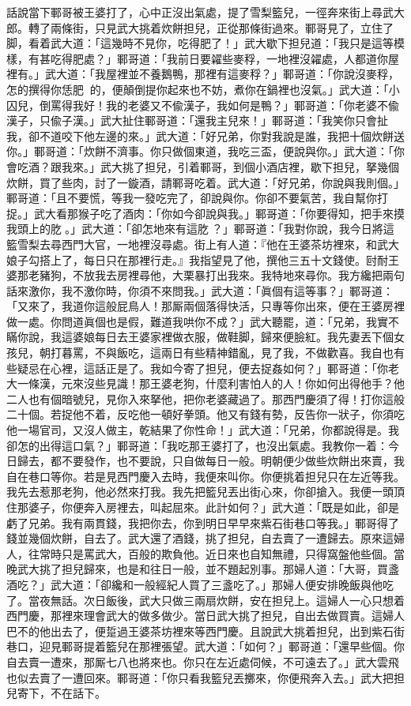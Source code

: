 話說當下鄆哥被王婆打了，心中正沒出氣處，提了雪梨籃兒，一徑奔來街上尋武大郎。轉了兩條街，只見武大挑着炊餅担兒，正從那條街過來。鄆哥見了，立住了脚，看着武大道：「這幾時不見你，吃得肥了！」武大歇下担兒道：「我只是這等模樣，有甚吃得肥處？」鄆哥道：「我前日要糴些麥稃，一地裡沒糴處，人都道你屋裡有。」武大道：「我屋裡並不養鵝鴨，那裡有這麥稃？」鄆哥道：「你說沒麥稃，怎的撰得你恁肥𦞂𦞂的，便顛倒提你起來也不妨，煮你在鍋裡也沒氣。」{}武大道：「小囚兒，倒罵得我好！我的老婆又不偸漢子，{}我如何是鴨？」鄆哥道：「你老婆不偸漢子，只偸子漢。」武大扯住鄆哥道：「還我主兒來！」鄆哥道：「我笑你只會扯我，卻不道咬下他左邊的來。」武大道：「好兄弟，你對我說是誰，我把十個炊餅送你。」鄆哥道：「炊餅不濟事。你只做個東道，我吃三盃，便說與你。」武大道：「你會吃酒？跟我來。」武大挑了担兒，引着鄆哥，到個小酒店裡，歇下担兒，拏幾個炊餅，買了些肉，討了一鏇酒，請鄆哥吃着。武大道：「好兄弟，你說與我則個。」鄆哥道：「且不要慌，等我一發吃完了，卻說與你。你卻不要氣苦，我自幫你打捉。」武大看那猴子吃了酒肉：「你如今卻說與我。」鄆哥道：「你要得知，把手來摸我頭上的肐𦞂。」武大道：「卻怎地來有這肐𦞂？」鄆哥道：「我對你說，我今日將這籃雪梨去尋西門大官，一地裡沒尋處。街上有人道：『他在王婆茶坊裡來，和武大娘子勾搭上了，每日只在那裡行走。』我指望見了他，撰他三五十文錢使。尀耐王婆那老豬狗，不放我去房裡尋他，大栗暴打出我來。我特地來尋你。我方纔把兩句話來激你，我不激你時，你須不來問我。」武大道：「眞個有這等事？」鄆哥道：「又來了，我道你這般屁鳥人！那厮兩個落得快活，只專等你出來，便在王婆房裡做一處。你問道眞個也是假，難道我哄你不成？」武大聽罷，道：「兄弟，我實不瞞你說，我這婆娘每日去王婆家裡做衣服，做鞋脚，歸來便臉紅。我先妻丟下個女孩兒，朝打暮罵，不與飯吃，這兩日有些精神錯亂，見了我，不做歡喜。我自也有些疑忌在心裡，這話正是了。我如今寄了担兒，便去捉姦如何？」鄆哥道：「你老大一條漢，元來沒些見識！那王婆老狗，什麼利害怕人的人！你如何出得他手？他二人也有個暗號兒，見你入來拏他，把你老婆藏過了。那西門慶須了得！打你這般二十個。若捉他不着，反吃他一頓好拳頭。他又有錢有勢，反告你一狀子，你須吃他一場官司，又沒人做主，乾結果了你性命！」{}武大道：「兄弟，你都說得是。我卻怎的出得這口氣？」鄆哥道：「我吃那王婆打了，也沒出氣處。我教你一着：今日歸去，都不要發作，也不要說，只自做每日一般。明朝便少做些炊餅出來賣，我自在巷口等你。若是見西門慶入去時，我便來叫你。你便挑着担兒只在左近等我。我先去惹那老狗，他必然來打我。我先把籃兒丟出街心來，你卻搶入。我便一頭頂住那婆子，你便奔入房裡去，叫起屈來。此計如何？」武大道：「既是如此，卻是虧了兄弟。我有兩貫錢，我把你去，你到明日早早來紫石街巷口等我。」鄆哥得了錢並幾個炊餅，自去了。武大還了酒錢，挑了担兒，自去賣了一遭歸去。原來這婦人，往常時只是罵武大，百般的欺負他。近日來也自知無禮，只得窩盤他些個。{}當晚武大挑了担兒歸來，也是和往日一般，並不題起別事。那婦人道：「大哥，買盞酒吃？」武大道：「卻纔和一般經紀人買了三盞吃了。」那婦人便安排晚飯與他吃了。當夜無話。次日飯後，武大只做三兩扇炊餅，安在担兒上。這婦人一心只想着西門慶，那裡來理會武大的做多做少。當日武大挑了担兒，自出去做買賣。這婦人巴不的他出去了，便踅過王婆茶坊裡來等西門慶。且說武大挑着担兒，出到紫石街巷口，迎見鄆哥提着籃兒在那裡張望。{}武大道：「如何？」鄆哥道：「還早些個。你自去賣一遭來，那厮七八也將來也。你只在左近處伺候，不可遠去了。」武大雲飛也似去賣了一遭回來。鄆哥道：「你只看我籃兒丟擲來，你便飛奔入去。」武大把担兒寄下，不在話下。

